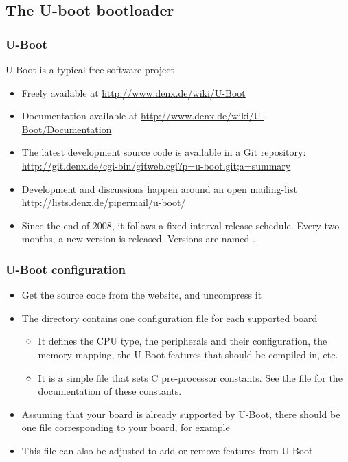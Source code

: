 \subsection{The U-boot bootloader}

\begin{frame}
  \frametitle{U-Boot}
  U-Boot is a typical free software project
  \begin{itemize}
  \item Freely available at \url{http://www.denx.de/wiki/U-Boot}
  \item Documentation available at
    \url{http://www.denx.de/wiki/U-Boot/Documentation}
  \item The latest development source code is available in a Git
    repository:
    \url{http://git.denx.de/cgi-bin/gitweb.cgi?p=u-boot.git;a=summary}
  \item Development and discussions happen around an open mailing-list
    \url{http://lists.denx.de/pipermail/u-boot/}
  \item Since the end of 2008, it follows a fixed-interval release
    schedule. Every two months, a new version is released. Versions
    are named .
\end{itemize}
\end{frame}

\begin{frame}
  \frametitle{U-Boot configuration}
  \begin{itemize}
  \item Get the source code from the website, and uncompress it
  \item The  directory contains one
    configuration file for each supported board
    \begin{itemize}
    \item It defines the CPU type, the peripherals and their configuration, the
      memory mapping, the U-Boot features that should be compiled in, etc.
    \item It is a simple  file that sets C pre-processor
      constants. See the  file for the documentation of
      these constants.
    \end{itemize}
  \item Assuming that your board is already supported by U-Boot, there
    should be one file corresponding to your board, for example
  \item This file can also be adjusted to add or remove features from
    U-Boot
  \end{itemize}
\end{frame}

